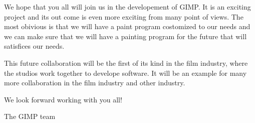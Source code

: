 We hope that you all will join us in the developement of GIMP. It is an exciting project and its out come is even more exciting from many point of views. The most obivious is that we will have a paint program costomized to our needs and we can make sure that we will have a painting program for the future that will satisfices our needs. 

This future collaboration will be the first of its kind in the film industry, where the studios work together to develope software. It will be an example for many more collaboration in the film industry and other industry.  

We look forward working with you all!

	The GIMP team
 
